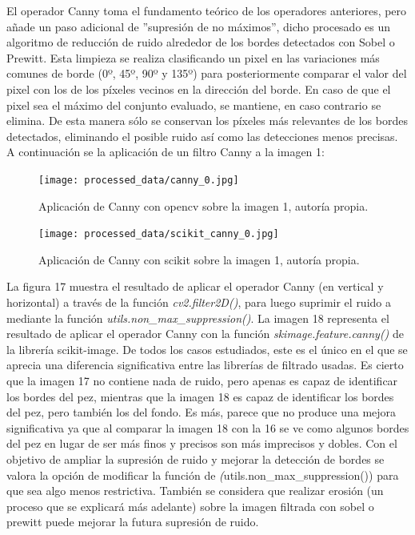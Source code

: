 \documentclass[a4paper,12pt]{article}
\begin{document}
{\vspace{0.5cm}

El operador Canny toma el fundamento teórico de los operadores anteriores, pero añade un paso adicional de ''supresión de
no máximos'', dicho procesado es un algoritmo de reducción de ruido alrededor de los bordes detectados con Sobel o Prewitt.
Esta limpieza se realiza clasificando un pixel en las variaciones más comunes de borde (0º, 45º, 90º y 135º) para posteriormente
comparar el valor del pixel con los de los píxeles vecinos en la dirección del borde. En caso de que el pixel sea el máximo del 
conjunto evaluado, se mantiene, en caso contrario se elimina. De esta manera sólo se conservan los píxeles más relevantes de 
los bordes detectados, eliminando el posible ruido así como las detecciones menos precisas. A continuación se la aplicación de
un filtro Canny a la imagen 1:

\vspace{0.5cm}

\begin{figure}[H]
  \centering
  \begin{minipage}[t]{0.35\textwidth}
      \centering
      \texttt{[image: processed\_data/canny\_0.jpg]} 
      \caption{Aplicación de Canny con opencv sobre la imagen 1, autoría propia.}
      \label{fig:cv2-canny}
  \end{minipage}
  \hfill
  \begin{minipage}[t]{0.35\textwidth}
      \centering
      \texttt{[image: processed\_data/scikit\_canny\_0.jpg]} 
      \caption{Aplicación de Canny con scikit sobre la imagen 1, autoría propia.}
      \label{fig:scikit-canny}
  \end{minipage}
\end{figure}

\vspace{1cm}

La figura 17 muestra el resultado de aplicar el operador Canny (en vertical y horizontal) a través de la función \textit{cv2.filter2D()}, 
para luego suprimir el ruido a mediante la función \textit{utils.non\_max\_suppression()}. La imagen 18 representa el resultado de aplicar 
el operador Canny con la función \textit{skimage.feature.canny()} de la librería scikit-image. De todos los casos estudiados, este es el 
único en el que se aprecia una diferencia significativa entre las librerías de filtrado usadas. Es cierto que la imagen 17 no contiene nada 
de ruido, pero apenas es capaz de identificar los bordes del pez, mientras que la imagen 18 es capaz de identificar los bordes del pez, 
pero también los del fondo. Es más, parece que no produce una mejora significativa ya que al comparar la imagen 18 con la 16 se ve como algunos 
bordes del pez en lugar de ser más finos y precisos son más imprecisos y dobles. Con el objetivo de ampliar la supresión de ruido y mejorar 
la detección de bordes se valora la opción de modificar la función de \textit(utils.non\_max\_suppression()) para que sea algo menos restrictiva.
También se considera que realizar erosión (un proceso que se explicará más adelante) sobre la imagen filtrada con sobel o prewitt puede mejorar
la futura supresión de ruido.

}
\end{document}
